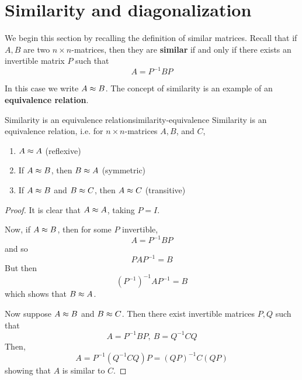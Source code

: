 \section{Similarity and diagonalization}

We begin this section by recalling the definition  of similar matrices. 
Recall that if $A,B$ are two $n\times n$-matrices, then they are \textbf{similar}
if and only if there exists an invertible matrix $P$
such that
\begin{equation*}
A=P^{-1}BP
\end{equation*}

In this case we write $A\approx B$. The concept of similarity is an example of an \textbf{equivalence relation}.

\begin{lemma}{Similarity is an equivalence relation}{similarity-equivalence}
Similarity is an equivalence relation, i.e. for $n \times n$-matrices $A,B$, and $C$, 
\begin{enumerate}
\item $A \approx A$ (reflexive)
\item If $A \approx B$, then $B \approx A$ (symmetric)
\item If $A \approx B$ and $B \approx C$, then $A \approx C$ (transitive)
\end{enumerate}
\end{lemma}

\begin{proof}
It is clear that $A\approx A$, taking $P=I$. 

Now, if $A\approx B$, then for some $P$ invertible,
\begin{equation*}
A=P^{-1}BP
\end{equation*}
and so
\begin{equation*}
PAP^{-1}=B
\end{equation*}
But then
\begin{equation*}
(P^{-1}) ^{-1}AP^{-1}=B
\end{equation*}
which shows that $B\approx A$.

Now suppose $A\approx B$ and $B\approx C$. Then there exist invertible matrices 
$P,Q$ such that
\begin{equation*}
A=P^{-1}BP,\ B=Q^{-1}CQ
\end{equation*}
Then,
\begin{equation*}
A=P^{-1} (Q^{-1}CQ)P=(QP) ^{-1}C(QP)
\end{equation*}
showing that $A$ is similar to $C$.
\end{proof}

